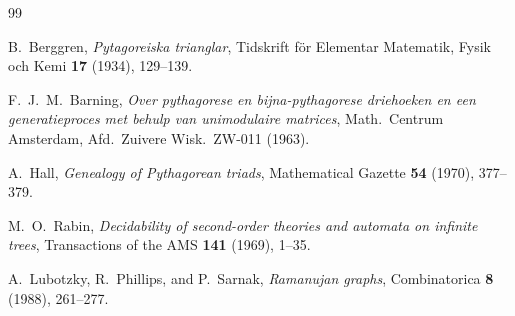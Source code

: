 \documentclass[12pt]{amsart}
\theoremstyle{definition}
\theoremstyle{remark}
\begin{document}
\begin{thebibliography}{99}

B.~Berggren,
\emph{Pytagoreiska trianglar},
Tidskrift f\"or Elementar Matematik, Fysik och Kemi \textbf{17} (1934), 129--139.

F.~J.~M.~Barning,
\emph{Over pythagorese en bijna-pythagorese driehoeken en een generatieproces met behulp van unimodulaire matrices},
Math.\ Centrum Amsterdam, Afd.\ Zuivere Wisk.\ ZW-011 (1963).

A.~Hall,
\emph{Genealogy of Pythagorean triads},
Mathematical Gazette \textbf{54} (1970), 377--379.

M.~O.~Rabin,
\emph{Decidability of second-order theories and automata on infinite trees},
Transactions of the AMS \textbf{141} (1969), 1--35.

A.~Lubotzky, R.~Phillips, and P.~Sarnak,
\emph{Ramanujan graphs},
Combinatorica \textbf{8} (1988), 261--277.

\end{thebibliography}
\end{document}
